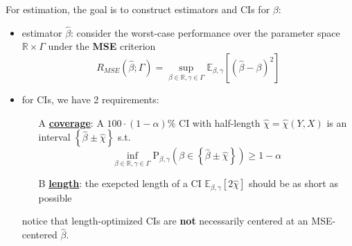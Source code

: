 \documentclass{article}
\begin{document}
For estimation, the goal is to construct estimators and CIs for $\beta$:
\begin{itemize}
  \item estimator $\hat{\beta}$: consider the worst-case performance over the parameter space $\mathbb{R}\times\Gamma$ under the \textbf{MSE} criterion
  $$
  R_{MSE}\left(\hat{\beta};\Gamma\right)=\sup_{\beta\in\mathbb{R},\gamma\in\Gamma}\mathbb{E}_{\beta,\gamma}\left[\left(\hat{\beta}-\beta\right)^2\right]
  $$
  \item for CIs, we have 2 requirements:
  \begin{itemize}
    \item[A] \underline{\textbf{coverage}}: A $100\cdot(1-\alpha)\%$ CI with half-length $\hat{\chi}=\hat{\chi}(Y,X)$ is an interval $\left\{\hat{\beta}\pm \hat{\chi}\right\}$ s.t.$$ \inf_{\beta\in\mathbb{R},\gamma\in\Gamma} \mathrm{P}_{\beta,\gamma}\left(\beta\in\left\{\hat{\beta}\pm\hat{\chi}\right\}\right) \geq 1-\alpha $$
    \item[B] \underline{\textbf{length}}: the exepcted length of a CI $\mathbb{E}_{\beta,\gamma}\left[2\hat{\chi}\right]$ should be as short as possible
  \end{itemize}
  notice that length-optimized CIs are \textbf{not} necessarily centered at an MSE-centered $\hat{\beta}$.
\end{itemize}
\end{document}
